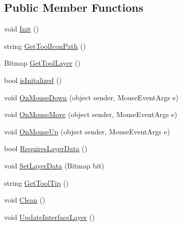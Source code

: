 \subsection*{Public Member Functions}
\begin{DoxyCompactItemize}
\item 
void \mbox{\hyperlink{class_paint___program_1_1_selection_tool_afadcc35f14a6e833a09c225a4efc1ed7}{Init}} ()
\item 
string \mbox{\hyperlink{class_paint___program_1_1_selection_tool_ac93f281cfcc677551b140c350661d9df}{Get\+Tool\+Icon\+Path}} ()
\item 
Bitmap \mbox{\hyperlink{class_paint___program_1_1_selection_tool_ad8d0b5e9cf0486f7e3815db1536de03d}{Get\+Tool\+Layer}} ()
\item 
bool \mbox{\hyperlink{class_paint___program_1_1_selection_tool_a04d5a1f8ed1eb4fb786a09cf122b0200}{is\+Initalized}} ()
\item 
void \mbox{\hyperlink{class_paint___program_1_1_selection_tool_a1134ee98cfa46d98871716ede5f08d1f}{On\+Mouse\+Down}} (object sender, Mouse\+Event\+Args e)
\item 
void \mbox{\hyperlink{class_paint___program_1_1_selection_tool_adec8eaad22f0c7ac1a744247c87e16bc}{On\+Mouse\+Move}} (object sender, Mouse\+Event\+Args e)
\item 
void \mbox{\hyperlink{class_paint___program_1_1_selection_tool_aa271d61b0d9c182e9bba5fab0b2893eb}{On\+Mouse\+Up}} (object sender, Mouse\+Event\+Args e)
\item 
bool \mbox{\hyperlink{class_paint___program_1_1_selection_tool_a3e97ebc6bc62f194b42e2acdd24a498f}{Requires\+Layer\+Data}} ()
\item 
void \mbox{\hyperlink{class_paint___program_1_1_selection_tool_a3975a7e8ef98db8f1edaa5fd586fa486}{Set\+Layer\+Data}} (Bitmap bit)
\item 
string \mbox{\hyperlink{class_paint___program_1_1_selection_tool_a27eaa7276db68cea198c96a30b3dba9e}{Get\+Tool\+Tip}} ()
\item 
void \mbox{\hyperlink{class_paint___program_1_1_selection_tool_ac8b5875e3a8a10cac0c4e37f286c0e2e}{Clean}} ()
\item 
void \mbox{\hyperlink{class_paint___program_1_1_selection_tool_ad541275f644867e4fb0d95db8a723b14}{Update\+Interface\+Layer}} ()
\end{DoxyCompactItemize}
